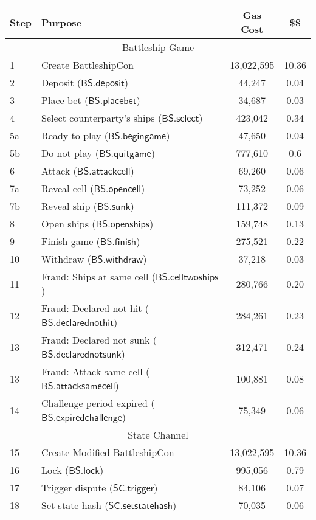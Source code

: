 \documentclass{llncs}
\newcommand{\statechanneldispute}{\mathsf{SC}.\mathsf{trigger}}
\newcommand{\statechannelsetstate}{\mathsf{SC}.\mathsf{setstatehash}}
\newcommand{\battleshipattackcell}{\mathsf{BS.attackcell}}
\newcommand{\battleshipbegin}{\mathsf{BS.begingame}}
\newcommand{\battleshipquit}{\mathsf{BS.quitgame}}
\newcommand{\battleshipplacebet}{\mathsf{BS.placebet}}
\newcommand{\battleshipselectboard}{\mathsf{BS.select}}
\newcommand{\battleshiprevealcell}{\mathsf{BS.opencell}}
\newcommand{\battleshipsinking}{\mathsf{BS.sunk}}
\newcommand{\battleshiprevealboard}{\mathsf{BS.openships}}
\newcommand{\battleshipdeposit}{\mathsf{BS.deposit}}
\newcommand{\battleshipwithdraw}{\mathsf{BS.withdraw}}
\newcommand{\battleshipfinish}{\mathsf{BS.finish}}
\newcommand{\battleshipdeclarednotsunk}{\mathsf{BS.declarednotsunk}}
\newcommand{\battleshipdeclarednothit}{\mathsf{BS.declarednothit}}
\newcommand{\battleshipsamecell}{\mathsf{BS.attacksamecell}}
\newcommand{\battleshiptwoships}{\mathsf{BS.celltwoships}}
\newcommand{\battleshipchallengeexpired}{\mathsf{BS.expiredchallenge}}
\newcommand{\battleshiplock}{\mathsf{BS.lock}}
\begin{document}
\begin{table}
	\centering
	\begin{tabular}[]{l l c c}
		
		\textbf{Step} & \textbf{Purpose} & \textbf{Gas Cost} & \textbf{\$\$}  \\ 
		\hline
		\multicolumn{4}{c}{Battleship Game} \\
		\hline
		1 & Create BattleshipCon & 13,022,595 & 10.36 \\
		2 & Deposit ($\battleshipdeposit$) & 44,247 & 0.04 \\
		3 & Place bet ($\battleshipplacebet$)& 34,687 & 0.03 \\
		4 & Select counterparty's ships ($\battleshipselectboard$) & 423,042 & 0.34 \\ 
		5a & Ready to play ($\battleshipbegin$) & 47,650 & 0.04 \\
		5b & Do not play ($\battleshipquit$) & 777,610 & 0.6 \\
		6 & Attack ($\battleshipattackcell$) & 69,260 & 0.06 \\
		7a & Reveal cell ($\battleshiprevealcell$) & 73,252 & 0.06 \\
		7b & Reveal ship ($\battleshipsinking$)& 111,372 & 0.09  \\
		8 & Open ships ($\battleshiprevealboard$) & 159,748 & 0.13 \\
		9 & Finish game ($\battleshipfinish$) & 275,521 & 0.22 \\
		10 & Withdraw ($\battleshipwithdraw$) & 37,218 &0.03 \\ 
		11 & Fraud: Ships at same cell ($\battleshiptwoships$) & 280,766 & 0.20\\
		12 & Fraud: Declared not hit ($\battleshipdeclarednothit$) & 284,261 & 0.23 \\
		13 & Fraud: Declared not sunk ($\battleshipdeclarednotsunk$) & 312,471 & 0.24 \\
		13 & Fraud: Attack same cell ($\battleshipsamecell$) & 100,881 & 0.08 \\
		14 & Challenge period expired ($\battleshipchallengeexpired$) &75,349 & 0.06 \\
		\hline
		\multicolumn{4}{c}{State Channel} \\
		\hline
		15 & Create Modified BattleshipCon & 13,022,595 & 10.36 \\
		16 & Lock ($\battleshiplock$) & 995,056 & 0.79 \\
		17 & Trigger dispute ($\statechanneldispute$) & 84,106 & 0.07\\
		18 & Set state hash ($\statechannelsetstate$) & 70,035 & 0.06 \\

\end{tabular}
\end{table}
\end{document}
